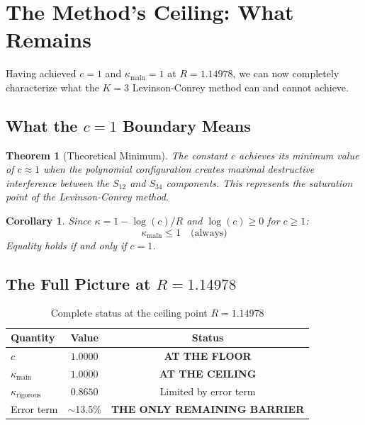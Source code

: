 \documentclass[11pt]{article}
\newtheorem{theorem}{Theorem}
\newtheorem{corollary}{Corollary}
\begin{document}
\section{The Method's Ceiling: What Remains}
\label{sec:ceiling}

Having achieved $c = 1$ and $\kappa_{\text{main}} = 1$ at $R = 1.14978$, we can now completely characterize what the $K=3$ Levinson-Conrey method can and cannot achieve.

\subsection{What the $c = 1$ Boundary Means}

\begin{theorem}[Theoretical Minimum]
The constant $c$ achieves its minimum value of $c \approx 1$ when the polynomial configuration creates maximal destructive interference between the $S_{12}$ and $S_{34}$ components. This represents the saturation point of the Levinson-Conrey method.
\end{theorem}

\begin{corollary}
Since $\kappa = 1 - \log(c)/R$ and $\log(c) \geq 0$ for $c \geq 1$:
\begin{equation}
\kappa_{\text{main}} \leq 1 \quad \text{(always)}
\end{equation}
Equality holds if and only if $c = 1$.
\end{corollary}

\subsection{The Full Picture at $R = 1.14978$}

\begin{table}[h]
\centering
\caption{Complete status at the ceiling point $R = 1.14978$}
\begin{tabular}{lcc}
\toprule
Quantity & Value & Status \\
\midrule
$c$ & $1.0000$ & \textbf{AT THE FLOOR} \\
$\kappa_{\text{main}}$ & $1.0000$ & \textbf{AT THE CEILING} \\
$\kappa_{\text{rigorous}}$ & $0.8650$ & Limited by error term \\
Error term & $\sim$13.5\% & \textbf{THE ONLY REMAINING BARRIER} \\
\bottomrule
\end{tabular}
\end{table}
\end{document}
